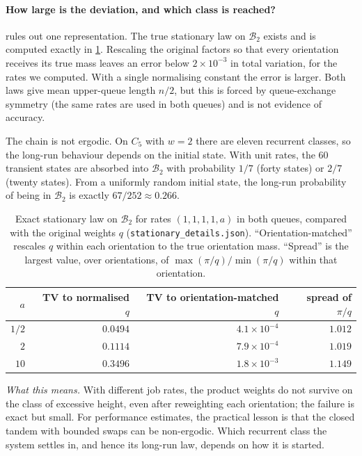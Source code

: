\documentclass[11pt,a4paper]{article}
\theoremstyle{plain}
\theoremstyle{plain}
\newcommand{\Bal}{\mathcal{B}}
\newcommand{\what}[1]{\par\smallskip\noindent\textit{What this means.} #1\par\smallskip}
\begin{document}
\paragraph{How large is the deviation, and which class is reached?}  rules out one representation. The true stationary law on $\Bal_2$ exists and is computed exactly in \cref{tab:deviation}. Rescaling the original factors so that every orientation receives its true mass leaves an error below $2\times10^{-3}$ in total variation, for the rates we computed. With a single normalising constant the error is larger. Both laws give mean upper-queue length $n/2$, but this is forced by queue-exchange symmetry (the same rates are used in both queues) and is not evidence of accuracy.

The chain is not ergodic. On $C_5$ with $w=2$ there are eleven recurrent classes, so the long-run behaviour depends on the initial state. With unit rates, the $60$ transient states are absorbed into $\Bal_2$ with probability $1/7$ (forty states) or $2/7$ (twenty states). From a uniformly random initial state, the long-run probability of being in $\Bal_2$ is exactly $67/252\approx0.266$.

\begin{table}[t]
\centering\small
\caption{Exact stationary law on $\Bal_2$ for rates $(1,1,1,1,a)$ in both queues, compared with the original weights $q$ (\texttt{stationary\_details.json}). ``Orientation-matched'' rescales $q$ within each orientation to the true orientation mass. ``Spread'' is the largest value, over orientations, of $\max(\pi/q)/\min(\pi/q)$ within that orientation.}
\label{tab:deviation}
\begin{tabular}{rrrr}
\toprule
$a$ & TV to normalised $q$ & TV to orientation-matched $q$ & spread of $\pi/q$\\
\midrule
$1/2$ & $0.0494$ & $4.1\times10^{-4}$ & $1.012$\\
$2$ & $0.1114$ & $7.9\times10^{-4}$ & $1.019$\\
$10$ & $0.3496$ & $1.8\times10^{-3}$ & $1.149$\\
\bottomrule
\end{tabular}
\end{table}

\what{With different job rates, the product weights do not survive on the class of excessive height, even after reweighting each orientation; the failure is exact but small. For performance estimates, the practical lesson is that the closed tandem with bounded swaps can be non-ergodic. Which recurrent class the system settles in, and hence its long-run law, depends on how it is started.}
\end{document}
